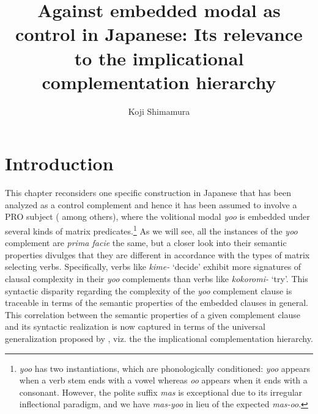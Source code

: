 \documentclass[output=paper]{langsci/langscibook}
\author{Koji Shimamura\affiliation{Kobe City University of Foreign Studies}}
\title[Against embedded modal as control in Japanese]
      {Against embedded modal as control in Japanese: Its relevance to the implicational complementation hierarchy}
\begin{document}
\maketitle

\section{Introduction}
This chapter reconsiders one specific construction in Japanese that has been analyzed as a control complement and hence it has been assumed to involve a PRO subject (\citealt{fujii2006,fujii2010,takano2010,uchibori2000} among others), where the volitional modal \textit{yoo} is embedded under several kinds of matrix predicates.\footnote{\textit{yoo} has two instantiations, which are phonologically conditioned: \textit{yoo} appears when a verb stem ends with a vowel whereas \textit{oo} appears when it ends with a consonant. However, the polite suffix \textit{mas} is exceptional due to its irregular inflectional paradigm, and we have \textit{mas-yoo} in lieu of the expected \textit{mas-oo}.} As we will see, all the instances of the \textit{yoo} complement are \textit{prima facie} the same, but a closer look into their semantic properties divulges that they are different in accordance with the types of matrix selecting verbs. Specifically, verbs like \textit{kime-} `decide' exhibit more signatures of clausal complexity in their \textit{yoo} complements than verbs like \textit{kokoromi-} `try'. This syntactic disparity regarding the complexity of the \textit{yoo} complement clause is traceable in terms of the semantic properties of the embedded clauses in general. This correlation between the semantic properties of a given complement clause and its syntactic realization is now captured in terms of the universal generalization proposed by \citet{wurmbrandlohninger2020}, viz. the the implicational complementation hierarchy.
\end{document}
